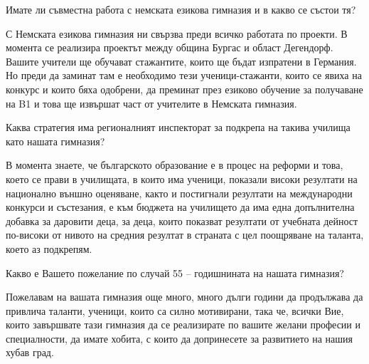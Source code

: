 \begin{multicols}{3}
Имате ли съвместна работа с немската езикова гимназия и в какво се състои тя?

С Немската езикова гимназия ни свързва преди всичко работата по проекти.  В 
момента се реализира  проектът между община Бургас и област Дегендорф. Вашите 
учители ще обучават стажантите, които ще бъдат изпратени в Германия. Но преди да 
заминат там е необходимо тези ученици-стажанти, които се явиха на конкурс и 
които бяха одобрени,  да преминат през езиково обучение за получаване на B1 и 
това ще извършат част от учителите в Немската гимназия.

Каква стратегия има регионалният инспекторат за подкрепа на такива училища 
като нашата гимназия?

В момента знаете, че българското образование е в процес на реформи и това, което 
се прави в училищата, в които има ученици, показали високи резултати на 
национално външно оценяване, както и постигнали резултати на международни 
конкурси и състезания, е към бюджета на училището да има една допълнителна 
добавка за даровити деца, за деца, които показват резултати от учебната дейност 
по-високи от нивото на средния резултат в страната с цел поощряване на таланта, 
което аз подкрепям.

Какво е Вашето пожелание по случай 55 – годишнината на нашата гимназия?

Пожелавам на вашата гимназия още много, много дълги години да продължава да 
привлича таланти, ученици, които са силно мотивирани, така че, всички Вие, които 
завършвате тази гимназия да се реализирате по вашите желани професии и 
специалности, да имате хобита, с които да допринесете за развитието на нашия 
хубав град.
\closearticle
\end{multicols}